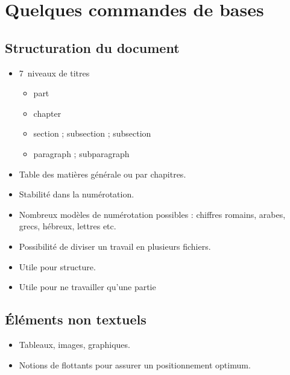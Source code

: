 \section[Les bases]{Quelques commandes de bases}

\subsection{Structuration du document}

\begin{slide}
  \begin{itemize}
    \item 7~niveaux de titres
      \begin{itemize}
	\item part
	\item chapter
	\item section ; subsection ; subsection
	\item paragraph ; subparagraph
      \end{itemize}
    \item Table des matières générale ou par chapitres.
    \item Stabilité dans la numérotation.
    \item Nombreux modèles de numérotation possibles : chiffres romains, arabes, grecs, hébreux, lettres etc.
  \end{itemize}
\end{slide}
\begin{slide}
\begin{itemize}
  \item Possibilité de diviser un travail en plusieurs fichiers.
  \item Utile pour structure.
  \item Utile pour ne travailler qu'une partie
\end{itemize}
\end{slide}
\subsection{Éléments non textuels}

\begin{slide}
  \begin{itemize}
    \item Tableaux, images, graphiques.
    \item Notions de flottants pour assurer un positionnement optimum.
  \end{itemize}
\end{slide}

